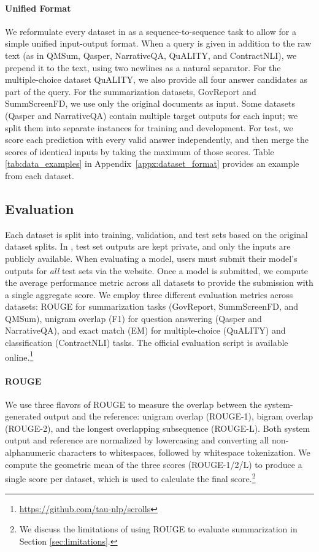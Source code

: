 \paragraph{Unified Format} We reformulate every dataset in \scrolls{} as a sequence-to-sequence task to allow for a simple unified input-output format. When a query is given in addition to the raw text (as in QMSum, Qasper, NarrativeQA, QuALITY, and ContractNLI), we prepend it to the text, using two newlines as a natural separator. For the multiple-choice dataset QuALITY, we also provide all four answer candidates as part of the query. For the summarization datasets, GovReport and SummScreenFD, we use only the original documents as input. Some datasets (Qasper and NarrativeQA) contain multiple target outputs for each input; we split them into separate instances for training and development. For test, we score each prediction with every valid answer independently, and then merge the scores of identical inputs by taking the maximum of those scores. Table \ref{tab:data_examples} in Appendix~\ref{appx:dataset_format} provides an example from each \scrolls{} dataset. 

\subsection{Evaluation}

Each dataset is split into training, validation, and test sets based on the original dataset splits. In \scrolls{}, test set outputs are kept private, and only the inputs are publicly available. When evaluating a model, users must submit their model's outputs for \textit{all} test sets via the \scrolls{} website. Once a model is submitted, we compute the average performance metric across all datasets to provide the submission with a single aggregate \scrolls{} score. We employ three different evaluation metrics across \scrolls{} datasets: ROUGE for summarization tasks (GovReport, SummScreenFD, and QMSum), unigram overlap (F1) for question answering (Qasper and NarrativeQA), and exact match (EM) for multiple-choice (QuALITY) and classification (ContractNLI) tasks. The official evaluation script is available online.\footnote{\label{github}\url{https://github.com/tau-nlp/scrolls}}

\paragraph{ROUGE}
We use three flavors of ROUGE \cite{lin-2004-rouge} to measure the overlap between the system-generated output and the reference: unigram overlap (ROUGE-1), bigram overlap (ROUGE-2), and the longest overlapping subsequence (ROUGE-L). Both system output and reference are normalized by lowercasing and converting all non-alphanumeric characters to whitespaces, followed by whitespace tokenization. We compute the geometric mean of the three scores (ROUGE-1/2/L) to produce a single score per dataset, which is used to calculate the final \scrolls{} score.\footnote{We discuss the limitations of using ROUGE to evaluate summarization in Section \ref{sec:limitations}.}

